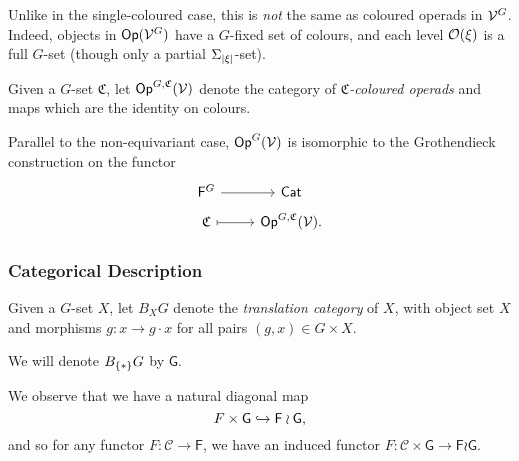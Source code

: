 \documentclass[a4paper,10pt
,draft
]{article}%
\begin{document}
\begin{remark}
      Unlike in the single-coloured case, this is \textit{not} the same as coloured operads in $\mathcal V^G$.
      Indeed, objects in $\mathsf{Op}(\mathcal V^G)$ have a $G$-fixed set of colours, and each level $\mathcal{O}(\xi)$ is a full $G$-set
      (though only a partial $\Sigma_{|\xi|}$-set).
\end{remark}

\begin{definition}
      Given a $G$-set $\mathfrak C$, let $\mathsf{Op}^{G,\mathfrak C}(\mathcal V)$ denote the category of \textit{$\mathfrak C$-coloured operads} and maps which are the identity on colours.

      Parallel to the non-equivariant case, $\mathsf{Op}^G(\mathcal V)$ is isomorphic to the Grothendieck construction on the functor
            \begin{equation}
            \begin{tikzcd}[row sep = tiny]
                  \mathsf F^G \arrow[r] & \mathsf{Cat}
                  \\
                  \mathfrak C \arrow[r, mapsto] & \Op^{G,\mathfrak C}(\V).
            \end{tikzcd}
      \end{equation}
      
\end{definition}

\subsubsection{Categorical Description}

\begin{definition}
      Given a $G$-set $X$, let $B_XG$ denote the \textit{translation category} of $X$,
      with object set $X$ and morphisms $g: x \to g\cdot x$ for all pairs $(g,x) \in G \times X$.

      We will denote $B_{\set{\**}}G$ by $\mathsf G$.
\end{definition}

\begin{remark}
      We observe that we have a natural diagonal map
      \begin{equation}
            F \times \mathsf G \hookrightarrow \mathsf F \wr \mathsf G,
      \end{equation}
      and so for any functor $F: \mathcal C \to \mathsf F$, we have an induced functor
      $F: \mathcal C \times \mathsf G \to \mathsf F \wr \mathsf G$. 
\end{remark}
\end{document}
